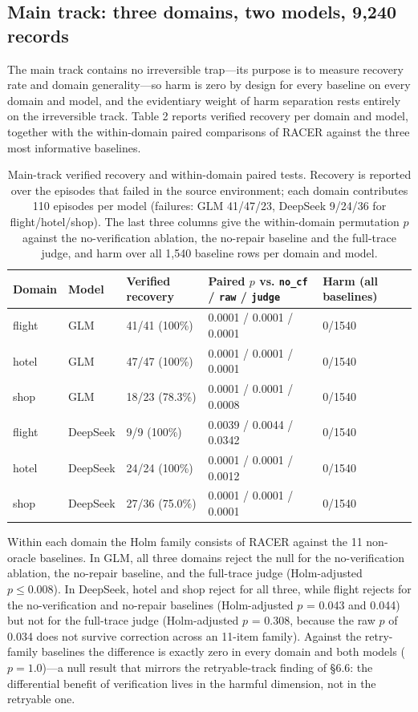 \documentclass[10pt]{article}
\begin{document}
\subsection{Main track: three domains, two models, 9,240 records}

The main track contains no irreversible trap---its purpose is to measure recovery rate and domain generality---so harm is zero by design for every baseline on every domain and model, and the evidentiary weight of harm separation rests entirely on the irreversible track. Table 2 reports verified recovery per domain and model, together with the within-domain paired comparisons of RACER against the three most informative baselines.

\begin{table}[t]
\centering
\caption{Main-track verified recovery and within-domain paired tests. Recovery is reported over the episodes that failed in the source environment; each domain contributes 110 episodes per model (failures: GLM 41/47/23, DeepSeek 9/24/36 for flight/hotel/shop). The last three columns give the within-domain permutation $p$ against the no-verification ablation, the no-repair baseline and the full-trace judge, and harm over all 1,540 baseline rows per domain and model.}
\label{tab:3}
\begin{tabular}{lllll}
\toprule
Domain & Model & Verified recovery & Paired $p$ vs. \texttt{no\_cf} / \texttt{raw} / \texttt{judge} & Harm (all baselines) \\
\midrule
flight & GLM & 41/41 (100\%) & 0.0001 / 0.0001 / 0.0001 & 0/1540 \\
hotel & GLM & 47/47 (100\%) & 0.0001 / 0.0001 / 0.0001 & 0/1540 \\
shop & GLM & 18/23 (78.3\%) & 0.0001 / 0.0001 / 0.0008 & 0/1540 \\
flight & DeepSeek & 9/9 (100\%) & 0.0039 / 0.0044 / 0.0342 & 0/1540 \\
hotel & DeepSeek & 24/24 (100\%) & 0.0001 / 0.0001 / 0.0012 & 0/1540 \\
shop & DeepSeek & 27/36 (75.0\%) & 0.0001 / 0.0001 / 0.0001 & 0/1540 \\
\bottomrule
\end{tabular}
\end{table}


Within each domain the Holm family consists of RACER against the 11 non-oracle baselines. In GLM, all three domains reject the null for the no-verification ablation, the no-repair baseline, and the full-trace judge (Holm-adjusted $p \le 0.008$). In DeepSeek, hotel and shop reject for all three, while flight rejects for the no-verification and no-repair baselines (Holm-adjusted $p$ = 0.043 and 0.044) but not for the full-trace judge (Holm-adjusted $p$ = 0.308, because the raw $p$ of 0.034 does not survive correction across an 11-item family). Against the retry-family baselines the difference is exactly zero in every domain and both models ($p = 1.0$)---a null result that mirrors the retryable-track finding of \S6.6: the differential benefit of verification lives in the harmful dimension, not in the retryable one.
\end{document}
